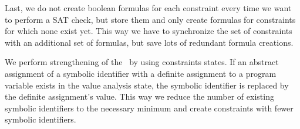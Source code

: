
Last, we do not create boolean formulas for each constraint every time we want to perform a SAT check, but store them and only create formulas for constraints for which none exist yet.
This way we have to synchronize the set of constraints with an additional set of formulas, but save lots of redundant formula creations.

We perform strengthening of the \ by using constraints states.
If an abstract assignment of a symbolic identifier with a definite assignment to a program variable exists in the value analysis state, the symbolic identifier is replaced by the definite assignment's value. This way we reduce the number of existing symbolic identifiers to the necessary minimum and create constraints with fewer symbolic identifiers.

